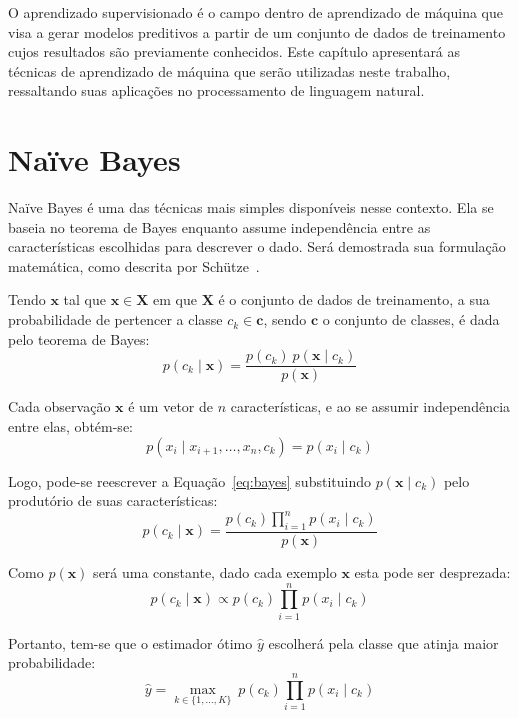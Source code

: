 O aprendizado supervisionado é o campo dentro de aprendizado de máquina que visa a gerar modelos preditivos a partir de
um conjunto de dados de treinamento cujos resultados são previamente conhecidos.
Este capítulo apresentará as técnicas de aprendizado de máquina que serão utilizadas neste trabalho, ressaltando suas
aplicações no processamento de linguagem natural.

\section{Naïve Bayes} \label{sec:bayes}

Naïve Bayes é uma das técnicas mais simples disponíveis nesse contexto.
Ela se baseia no teorema de Bayes enquanto assume independência entre as características escolhidas para descrever o
dado.
Será demostrada sua formulação matemática, como descrita por Schütze~\cite{schutze08}.

Tendo $\mathbf{x}$ tal que $\mathbf{x} \in \mathbf{X}$ em que $\mathbf{X}$ é o conjunto de dados de treinamento, a sua
probabilidade de pertencer a classe $c_k \in \mathbf{c}$, sendo $\mathbf{c}$ o conjunto de classes, é dada pelo teorema de Bayes:
\begin{equation} \label{eq:bayes}
    p(c_k \mid \mathbf{x}) = \frac{p(c_k) \ p(\mathbf{x} \mid c_k)}{p(\mathbf{x})}
\end{equation}

Cada observação $\mathbf{x}$ é um vetor de $n$ características, e ao se assumir independência entre elas, obtém-se:
\begin{equation}
    p(x_i \mid x_{i+1}, \dots ,x_{n}, c_k ) = p(x_i \mid c_k)
\end{equation}

Logo, pode-se reescrever a Equação~\ref{eq:bayes} substituindo $p(\mathbf{x} \mid c_k)$ pelo produtório de suas
características:
\begin{equation}
    p(c_k \mid \mathbf{x}) = \frac{p(c_k) \prod_{i=1}^n p(x_i \mid c_k)}{p(\mathbf{x})}
\end{equation}

Como $p(\mathbf{x})$ será uma constante, dado cada exemplo $\mathbf{x}$ esta pode ser desprezada:
\begin{equation}
    p(c_k \mid \mathbf{x}) \propto p(c_k) \prod_{i=1}^n p(x_i \mid c_k)
\end{equation}

Portanto, tem-se que o estimador ótimo $\hat{y}$ escolherá pela classe que atinja maior probabilidade:
\begin{equation}
    \hat{y} = \underset{k \in \{1, \dots, K\}}{\operatorname{max}} \ p(c_k) \displaystyle\prod_{i=1}^n p(x_i \mid c_k)
\end{equation}

